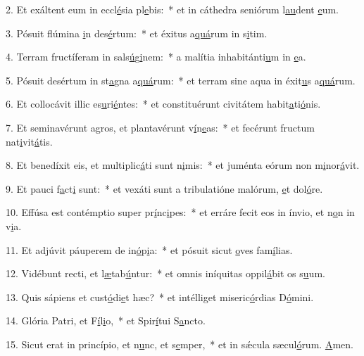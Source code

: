 2. Et exáltent eum in eccl\uline{é}sia pl\uline{e}bis:~* et in cáthedra seniórum l\uline{au}dent \uline{e}um.\par 
3. Pósuit flúmina \uline{i}n des\uline{é}rtum:~* et éxitus a\uline{quá}rum in s\uline{i}tim.\par 
4. Terram fructíferam in sals\uline{ú}g\uline{i}nem:~* a malítia inhabitánti\uline{u}m in \uline{e}a.\par 
5. Pósuit desértum in st\uline{a}gna a\uline{quá}rum:~* et terram sine aqua in éxit\uline{u}s a\uline{quá}rum.\par 
6. Et collocávit illic es\uline{u}ri\uline{é}ntes:~* et constituérunt civitátem habit\uline{a}ti\uline{ó}nis.\par 
7. Et seminavérunt agros, et plantavérunt v\uline{í}n\uline{e}as:~* et fecérunt fructum nat\uline{i}vit\uline{á}tis.\par 
8. Et benedíxit eis, et multiplic\uline{á}ti sunt n\uline{i}mis:~* et juménta eórum non m\uline{i}nor\uline{á}vit.\par 
9. Et pauci f\uline{a}ct\uline{i} sunt:~* et vexáti sunt a tribulatióne malórum, \uline{e}t dol\uline{ó}re.\par 
10. Effúsa est contémptio super pr\uline{í}nc\uline{i}pes:~* et erráre fecit eos in ínvio, et n\uline{o}n in v\uline{i}a.\par 
11. Et adjúvit páuperem de in\uline{ó}p\uline{i}a:~* et pósuit sicut \uline{o}ves fam\uline{í}lias.\par 
12. Vidébunt recti, et l\uline{æ}tab\uline{ú}ntur:~* et omnis iníquitas oppil\uline{á}bit os s\uline{u}um.\par 
13. Quis sápiens et cust\uline{ó}di\uline{e}t hæc?~* et intélliget miseric\uline{ó}rdias D\uline{ó}mini.\par 
14. Glória Patri, et F\uline{í}l\uline{i}o,~* et Spir\uline{í}tui S\uline{a}ncto.\par 
15. Sicut erat in princípio, et n\uline{u}nc, et s\uline{e}mper,~* et in sǽcula sæcul\uline{ó}rum. \uline{A}men.\par 
